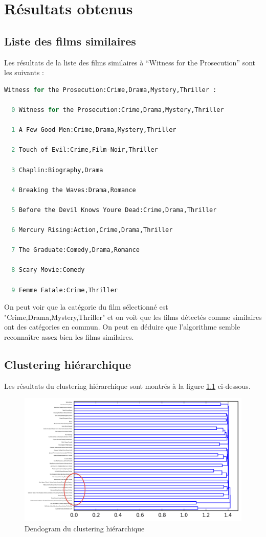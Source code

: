\chapter{Résultats obtenus}
\section{Liste des films similaires}

Les résultats de la liste des films similaires à ``Witness for the Prosecution'' sont les suivants : \\

\begin{lstlisting}[language=python]
  Witness for the Prosecution:Crime,Drama,Mystery,Thriller :

  0 Witness for the Prosecution:Crime,Drama,Mystery,Thriller

  1 A Few Good Men:Crime,Drama,Mystery,Thriller

  2 Touch of Evil:Crime,Film-Noir,Thriller

  3 Chaplin:Biography,Drama

  4 Breaking the Waves:Drama,Romance

  5 Before the Devil Knows Youre Dead:Crime,Drama,Thriller

  6 Mercury Rising:Action,Crime,Drama,Thriller

  7 The Graduate:Comedy,Drama,Romance

  8 Scary Movie:Comedy

  9 Femme Fatale:Crime,Thriller
\end{lstlisting}

On peut voir que la catégorie du film sélectionné est "Crime,Drama,Mystery,Thriller" et on voit que les films détectés comme similaires ont des catégories en commun. On peut en déduire que l'algorithme semble reconnaître assez bien les films similaires.

\newpage
\section{Clustering hiérarchique}

Les résultats du clustering hiérarchique sont montrés à la figure \ref{hierarchical} ci-dessous.

\begin{figure}[h]
  \centering
    \includegraphics[width=0.6\linewidth]{img/clustering50_tf_idf.png}
  \caption{Dendogram du clustering hiérarchique}
  \label{hierarchical}
\end{figure}

